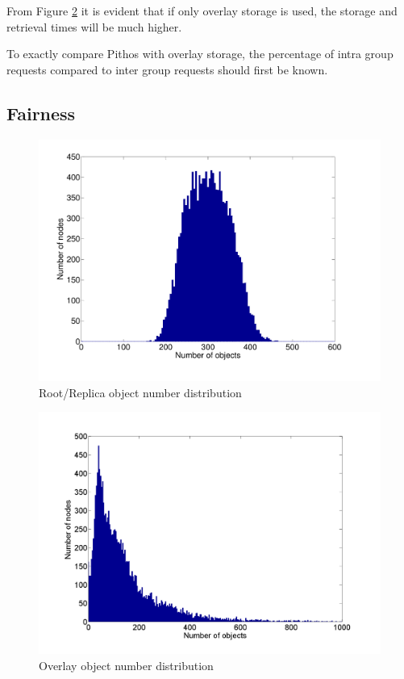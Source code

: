 \documentclass[10pt,a4paper,conference]{IEEEtran}
\begin{document}
From Figure \ref{fig_pithos_response} it is evident that if only overlay storage is used, the storage and retrieval times will be much higher.

To exactly compare Pithos with overlay storage, the percentage of intra group requests compared to inter group requests should first be known.

\subsection{Fairness}

\begin{figure}[htbp]
 \centering
 \includegraphics[clip=true, viewport=1.5cm 1.8cm 26.5cm 20cm, width=\columnwidth]{RootRepObjects}
 \caption{Root/Replica object number distribution}
 \label{fig_pithos_response}
\end{figure}

\begin{figure}[htbp]
 \centering
 \includegraphics[clip=true, viewport=1.5cm 1.2cm 27cm 19.7cm, width=\columnwidth]{OverlayObjects}
 \caption{Overlay object number distribution}
 \label{fig_pithos_response}
\end{figure}
\end{document}
